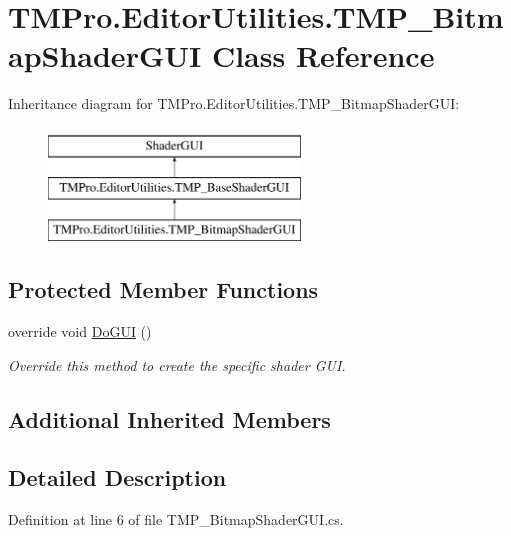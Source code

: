 \hypertarget{class_t_m_pro_1_1_editor_utilities_1_1_t_m_p___bitmap_shader_g_u_i}{}\section{T\+M\+Pro.\+Editor\+Utilities.\+T\+M\+P\+\_\+\+Bitmap\+Shader\+G\+UI Class Reference}
\label{class_t_m_pro_1_1_editor_utilities_1_1_t_m_p___bitmap_shader_g_u_i}
Inheritance diagram for T\+M\+Pro.\+Editor\+Utilities.\+T\+M\+P\+\_\+\+Bitmap\+Shader\+G\+UI\+:\begin{figure}[H]
\begin{center}
\leavevmode
\includegraphics[height=3.000000cm]{class_t_m_pro_1_1_editor_utilities_1_1_t_m_p___bitmap_shader_g_u_i}
\end{center}
\end{figure}
\subsection*{Protected Member Functions}
\begin{DoxyCompactItemize}
\item 
override void \mbox{\hyperlink{class_t_m_pro_1_1_editor_utilities_1_1_t_m_p___bitmap_shader_g_u_i_af4f6c43167899462930161b3db412cb5}{Do\+G\+UI}} ()
\begin{DoxyCompactList}\small\item\em Override this method to create the specific shader G\+UI. \end{DoxyCompactList}\end{DoxyCompactItemize}
\subsection*{Additional Inherited Members}


\subsection{Detailed Description}


Definition at line 6 of file T\+M\+P\+\_\+\+Bitmap\+Shader\+G\+U\+I.\+cs.




